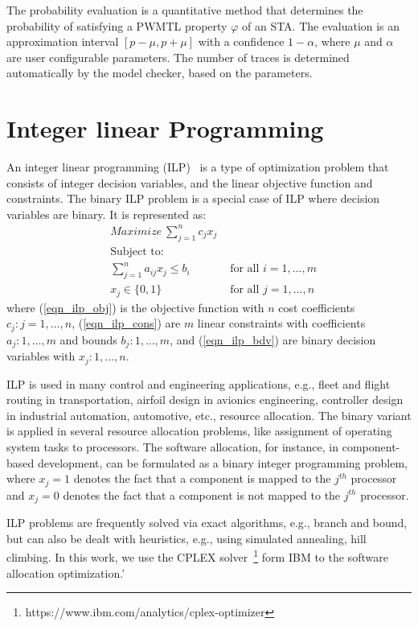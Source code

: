 The probability evaluation is a quantitative method that determines the probability of satisfying a PWMTL property $\varphi$ of an STA. The evaluation is an approximation interval $[p-\mu,p+\mu]$ with a confidence $1-\alpha$, where $\mu$ and $\alpha$ are user configurable parameters. The number of traces is determined automatically by the model checker, based on the parameters. 

\section{Integer linear Programming}
An integer linear programming (ILP)~\cite{Bradley1977AppliedProgramming} is a type of optimization problem that consists of integer decision variables, and the linear objective function and constraints. The binary ILP problem is a special case of ILP where decision variables are binary. It is represented as:
\begin{align}
    \label{eqn_ilp_obj}
	&Maximize\ \sum_{j=1}^{n}{c_jx_j}\\\nonumber
	&\mbox{Subject to:}&\\
	\label{eqn_ilp_cons}
	&\sum_{j=1}^n{a_{ij}x_j}\leq b_i&\mbox{ for all } i=1,...,m\\
	\label{eqn_ilp_bdv}
	&x_j\in\{0,1\} &\mbox{ for all } j=1,...,n
\end{align}
where (\ref{eqn_ilp_obj}) is the objective function with $n$ cost coefficients $c_j:j=1,...,n$, (\ref{eqn_ilp_cons}) are $m$ linear constraints with coefficients $a_j:1,...,m$ and bounds $b_j:1,...,m$, and (\ref{eqn_ilp_bdv}) are binary decision variables with $x_j:1,...,n$.

ILP is used in many control and engineering applications, e.g., fleet and flight routing in transportation, airfoil design in avionics engineering, controller design in industrial automation, automotive, etc., resource allocation. The binary variant is applied in several resource allocation problems, like assignment of operating system tasks to processors. The software allocation, for instance, in component-based development, can be formulated as a binary integer programming problem, where $x_j=1$ denotes the fact that a component is mapped to the $j^{th}$ processor and $x_j=0$ denotes the fact that a component is not mapped to the $j^{th}$ processor.

ILP problems are frequently solved via exact algorithms, e.g., branch and bound, but can also be dealt with heuristics, e.g., using simulated annealing, hill climbing. In this work, we use the CPLEX solver~\footnote{https://www.ibm.com/analytics/cplex-optimizer} form IBM to the software allocation optimization.'

